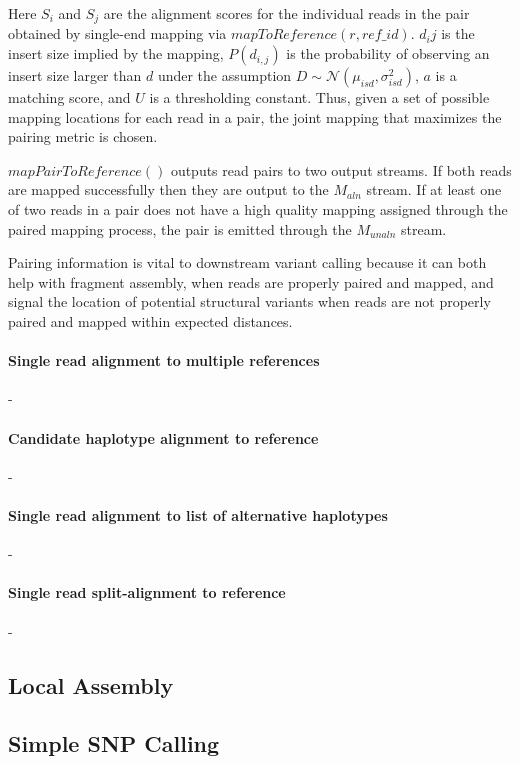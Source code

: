 Here $S_i$ and $S_j$ are the alignment scores for the individual reads in the pair obtained by single-end mapping via $mapToReference(r, ref\_id)$. $d_ij$ is the insert size implied by the mapping, $P(d_{i,j})$ is the probability of observing an insert size larger than $d$ under the assumption $D \sim \mathcal{N}(\mu_{isd}, \sigma_{isd}^2)$, $a$ is a matching score, and $U$ is a thresholding constant. Thus, given a set of possible mapping locations for each read in a pair, the joint mapping that maximizes the pairing metric is chosen.

$mapPairToReference()$ outputs read pairs to two output streams. If both reads are mapped successfully then they are output to the $M_{aln}$ stream. If at least one of two reads in a pair does not have a high quality mapping assigned through the paired mapping process, the pair is emitted through the $M_{unaln}$ stream.

Pairing information is vital to downstream variant calling because it can both help with fragment assembly, when reads are properly paired and mapped, and signal the location of potential structural variants when reads are not properly paired and mapped within expected distances.

\paragraph{Single read alignment to multiple references} -
\paragraph{Candidate haplotype alignment to reference} -
\paragraph{Single read alignment to list of alternative haplotypes} -
\paragraph{Single read split-alignment to reference} -


\subsection{Local Assembly}

\subsection{Simple SNP Calling}

